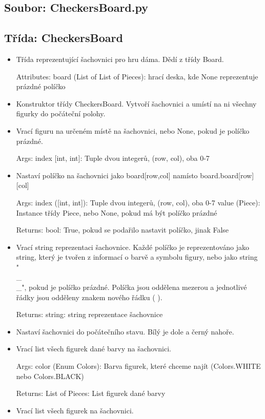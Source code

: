 \documentclass{article}
\begin{document}
\subsection*{Soubor: CheckersBoard.py}
\begin{itemize}
 \subsection*{Třída: CheckersBoard}
\begin{itemize}
\item{Třída reprezentující šachovnici pro hru dáma. Dědí z třídy Board.

Attributes:
    board (List of List of Pieces): hrací deska, kde None reprezentuje prázdné políčko}
\item{Konstruktor třídy CheckersBoard. Vytvoří šachovnici a umístí na ni všechny figurky do počáteční polohy.}
\item{Vrací figuru na určeném místě na šachovnici, nebo None, pokud je políčko prázdné. 

Args:
    index [int, int]: Tuple dvou integerů, (row, col), oba 0-7}
\item{Nastaví políčko na šachovnici jako board[row,col] namísto board.board[row][col] 

Args:
    index ([int, int]): Tuple dvou integerů, (row, col), oba 0-7
    value (Piece): Instance třídy Piece, nebo None, pokud má být políčko prázdné
    
Returns:
    bool: True, pokud se podařilo nastavit políčko, jinak False}
\item{    Vrací string reprezentaci šachovnice. Každé políčko je reprezentováno jako string, který je tvořen z informací o barvě a symbolu figury, nebo jako string "\\_\\_", pokud je políčko prázdné. Políčka jsou oddělena mezerou a jednotlivé řádky jsou odděleny znakem nového řádku (
).
    
    Returns:
        string: string reprezentace šachovnice
    }
\item{Nastaví šachovnici do počátečního stavu. Bílý je dole a černý nahoře.}
\item{Vrací list všech figurek dané barvy na šachovnici.

Args:
    color (Enum Colors): Barva figurek, které chceme najít (Colors.WHITE nebo Colors.BLACK)
    
Returns: 
    List of Pieces: List figurek dané barvy}
\item{Vrací list všech figurek na šachovnici.

}
\end{itemize}
\end{itemize}
\end{document}
